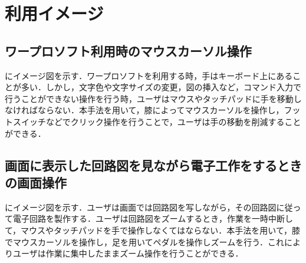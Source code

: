 \section{利用イメージ}
\subsection{ワープロソフト利用時のマウスカーソル操作}
にイメージ図を示す．ワープロソフトを利用する時，手はキーボード上にあることが多い．しかし，文字色や文字サイズの変更，図の挿入など，コマンド入力で行うことができない操作を行う時，ユーザはマウスやタッチパッドに手を移動しなければならない．本手法を用いて，膝によってマウスカーソルを操作し，フットスイッチなどでクリック操作を行うことで，ユーザは手の移動を削減することができる．
\subsection{画面に表示した回路図を見ながら電子工作をするときの画面操作}
にイメージ図を示す．ユーザは画面では回路図を写しながら，その回路図に従って電子回路を製作する．ユーザは回路図をズームするとき，作業を一時中断して，マウスやタッチパッドを手で操作しなくてはならない．本手法を用いて，膝でマウスカーソルを操作し，足を用いてペダルを操作しズームを行う．これによりユーザは作業に集中したままズーム操作を行うことができる．







